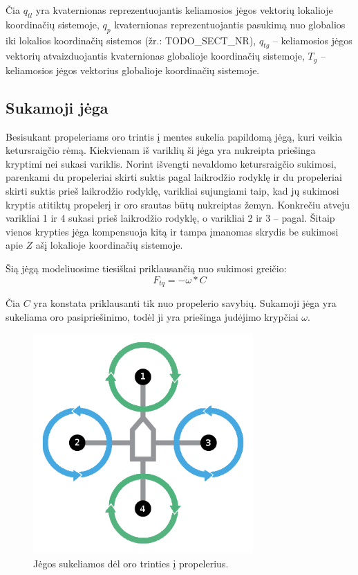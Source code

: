 \documentclass[12pt, a4paper, lithuanian, final]{article}
\begin{document}
Čia $q_{tl}$ yra kvaternionas reprezentuojantis keliamosios jėgos vektorių lokalioje koordinačių sistemoje, $q_{p}$ kvaternionas reprezentuojantis pasukimą nuo globalios iki lokalios koordinačių sistemos (žr.: TODO\_SECT\_NR), $q_{tg}$ -- keliamosios jėgos vektorių atvaizduojantis kvaternionas globalioje koordinačių sistemoje, $T_g$ -- keliamosios jėgos vektorius globalioje koordinačių sistemoje.





\subsection{Sukamoji jėga}

Besisukant propeleriams oro trintis į mentes sukelia papildomą jėgą, kuri veikia ketursraigčio rėmą.
Kiekvienam iš variklių ši jėga yra nukreipta priešinga kryptimi nei sukasi variklis.
Norint išvengti nevaldomo ketursraigčio sukimosi, parenkami du propeleriai skirti suktis pagal laikrodžio rodyklę ir du propeleriai skirti suktis prieš laikrodžio rodyklę, varikliai sujungiami taip, kad jų sukimosi kryptis atitiktų propelerį ir oro srautas būtų nukreiptas žemyn.
Konkrečiu atveju varikliai 1 ir 4 sukasi prieš laikrodžio rodyklę, o varikliai 2 ir 3 -- pagal.
Šitaip vienos krypties jėga kompensuoja kitą ir tampa įmanomas skrydis be sukimosi apie $Z$ ašį lokalioje koordinačių sistemoje.

Šią jėgą modeliuosime tiesiškai priklausančią nuo sukimosi greičio:
\begin{equation}
	F_{tq} = -\omega * C
\end{equation}

Čia $C$ yra konstata priklausanti tik nuo propelerio savybių. Sukamoji jėga yra sukeliama oro pasipriešinimo, todėl ji yra priešinga judėjimo krypčiai $\omega$.


\begin{figure}[H]
\begin{center}
\includegraphics[width=0.75\textwidth]{img/quadcopter-torque.png}
\caption{Jėgos sukeliamos dėl oro trinties į propelerius.}
\end{center}
\end{figure}
\end{document}
